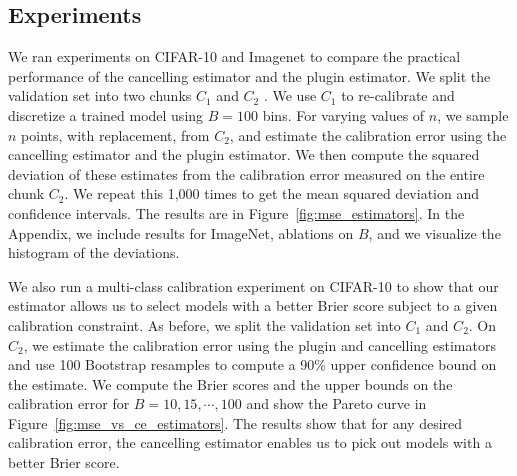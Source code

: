
\subsection{Experiments}

We ran experiments on CIFAR-10 and Imagenet to compare the practical performance of the cancelling estimator and the plugin estimator. We split the validation set  into two chunks $C_1$  and $C_2$ . We use $C_1$ to re-calibrate and discretize a trained model using $B = 100$ bins. For varying values of $n$, we sample $n$ points, with replacement, from $C_2$, and estimate the calibration error using the cancelling estimator and the plugin estimator. We then compute the squared deviation of these estimates from the calibration error measured on the entire chunk $C_2$. We repeat this 1,000 times to get the mean squared deviation and confidence intervals. The results are in Figure~\ref{fig:mse_estimators}. 
In the Appendix, we include results for ImageNet, ablations on $B$, and we visualize the histogram of the deviations.


We also run a multi-class calibration experiment on CIFAR-10 to show that our estimator allows us to select models with a better  Brier  score subject to a given calibration constraint. As before, we split the validation set into $C_1$ and $C_2$. On $C_2$, we estimate the calibration error using the plugin and cancelling estimators and use 100 Bootstrap resamples to compute a 90\% upper confidence bound on the estimate. We compute the Brier scores and the upper bounds on the calibration error for $B = 10, 15, \cdots, 100$ and show the Pareto curve in Figure~\ref{fig:mse_vs_ce_estimators}. The results show that for any desired calibration error, the cancelling estimator enables us to pick out models with a better Brier score.

